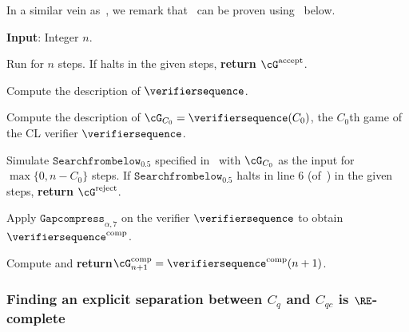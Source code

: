 In a similar vein as~, we remark that~ can be proven using~ below. 

\vspace{10pt}
\IncMargin{1em}
\begin{algorithm}[H]
	\DontPrintSemicolon
	
	\textbf{Input}: Integer $n$. 
	
	Run \Turingmachinehalt for $n$ steps. If \Turingmachinehalt halts in the given steps, \textbf{return} $\cG^{\text{accept}}$.
	
	Compute the description of $\verifiersequence$.
	
	Compute the description of $\cG_{C_0} = \verifiersequence(C_0)$, the $C_0$th game of the CL verifier $\verifiersequence$.
	
	Simulate $\texttt{Searchfrombelow}_{0.5}$ specified in~ with $\cG_{C_0}$ as the input for $\max\{0, n - C_0\}$ steps. If $\texttt{Searchfrombelow}_{0.5}$ halts in line 6 (of~) in the given steps, \textbf{return} $\cG^{\text{reject}}$. 
	
	Apply $\texttt{Gapcompress}_{\alpha, 7}$ on the verifier $\verifiersequence$ to obtain $\verifiersequence^{\text{comp}}$.
	
	Compute and \textbf{return}$\cG^{\text{comp}}_{n+1} = \verifiersequence^{\text{comp}}(n+1)$.
	
	\caption{The description for $\verifiersequence$ which generates the game sequences $\{\cG_n\}_{n \in \bN}$ for the proof of $\RE \subseteq \MIP^*$. \Turingmachinehalt is the instance of the halting problem for the reduction.}
	\label{pseu:verifiersequencemipstar}
\end{algorithm}\DecMargin{1em}
\vspace{10pt} 

\subsubsection{Finding an explicit separation between $C_{q}$ and $C_{qc}$ is $\RE$-complete} \label{sec:compproofoutline}

